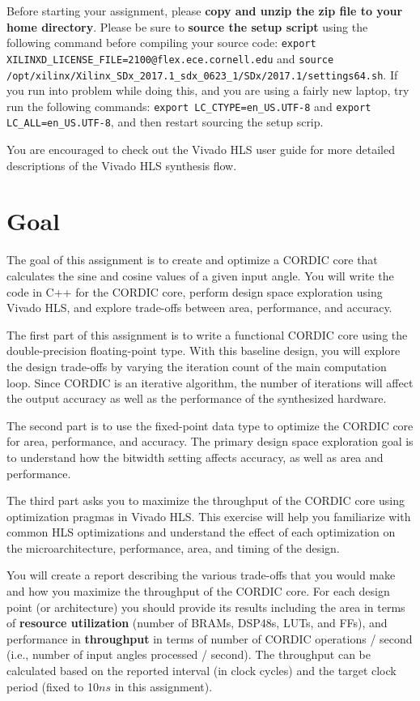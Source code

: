 \documentclass[paper=letter, fontsize=11.6pt]{scrartcl} %
\numberwithin{equation}{section} %
\numberwithin{figure}{section} %
\numberwithin{table}{section} %
\begin{document}
Before starting your assignment, please \textbf{copy and unzip the zip file to your home directory}. Please be sure to \textbf{source the setup script }using the following command before compiling your source code: \texttt{export XILINXD\_LICENSE\_FILE=2100@flex.ece.cornell.edu} and \texttt{source /opt/xilinx/Xilinx\_SDx\_2017.1\_sdx\_0623\_1/SDx/2017.1/settings64.sh}. If you run into problem while doing this, and you are using a fairly new laptop, try run the following commands: \texttt{export LC\_CTYPE=en\_US.UTF-8} and \texttt{export LC\_ALL=en\_US.UTF-8}, and then restart sourcing the setup scrip.

You are encouraged to check out the Vivado HLS user guide \cite{guide} for more detailed descriptions of the Vivado HLS synthesis flow.

\section{Goal}
The goal of this assignment is to create and optimize a CORDIC core  that calculates the sine and cosine values of a given input angle. You will write the code in C++ for the CORDIC core, perform design space exploration using Vivado HLS, and explore trade-offs between area, performance, and accuracy.

The first part of this assignment is to write a functional CORDIC core using the double-precision floating-point type. With this baseline design, you will explore the design trade-offs by varying the iteration count of the main computation loop.
Since CORDIC is an iterative algorithm, the number of iterations will affect the output accuracy as well as the performance of the synthesized hardware.

The second part is to use the fixed-point data type to optimize the CORDIC core for area, performance, and accuracy. The primary design space exploration goal is to understand how the bitwidth setting affects accuracy, as well as area and performance. 

The third part asks you to maximize the throughput of the CORDIC core using optimization pragmas in Vivado HLS. This exercise will help you familiarize with common HLS optimizations and understand the effect of each optimization on the microarchitecture, performance, area, and timing of the design.

You will create a report describing the various trade-offs that you would make and how you maximize the throughput of the CORDIC core. For each design point (or architecture) you should provide its results including the area in terms of \textbf{resource utilization} (number of BRAMs, DSP48s, LUTs, and FFs), and performance in \textbf{throughput} in terms of number of CORDIC operations / second (i.e., number of input angles processed / second). The throughput can be calculated based on the reported interval (in clock cycles) and the target clock period (fixed to 10$ns$ in this assignment). 
\end{document}
